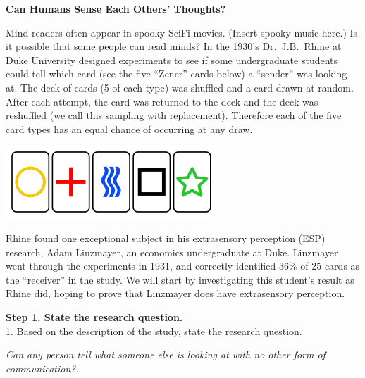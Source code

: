 \def\theTopic{ESP}
\def\dayNum{5}
\begin{center}
{\bf {\large Can Humans Sense Each Others' Thoughts?}}\\
\vspace{-.1in}
\end{center}


Mind readers often appear in spooky SciFi movies. (Insert spooky music
here.)  Is it
possible that some people can read minds? In the 1930's
Dr.~J.B.~Rhine at Duke University designed experiments to see if some
undergraduate students could tell which card (see the five ``Zener''
cards below) a ``sender'' was looking at. The deck of cards (5 of each
type) was shuffled and a card drawn at random. After each attempt, the
card was returned to the deck and the deck was reshuffled (we call
this sampling with replacement).  Therefore each of the five card types has
an equal chance of occurring at any draw. 
\begin{center}
  \includegraphics[width=.5\linewidth]{../../plots/Zener_cards.png}
\end{center}

 Rhine found one exceptional subject in his extrasensory perception
 (ESP) research, Adam Linzmayer, an economics undergraduate at Duke.
 Linzmayer went through the experiments in 1931, and correctly
 identified 36\% of 25 cards as the ``receiver'' in the study.   We will
 start by investigating this student's result as Rhine did, hoping to
 prove that Linzmayer does have extrasensory perception. 

{\bf Step 1. State the research question. }\\
1. Based on the description of the study, state the research question.
\begin{students}
  \vspace{2cm}
\end{students}

\begin{key}
{\it  Can any person tell what someone else is looking at with no
  other form of communication?.}
\end{key}



